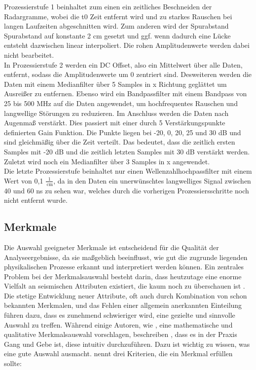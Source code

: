 Prozessierstufe 1 beinhaltet zum einen ein zeitliches Beschneiden der Radargramme, wobei die t0 Zeit entfernt wird und zu starkes Rauschen bei langen Laufzeiten abgeschnitten wird. Zum anderen wird der Spurabstand Spurabstand auf konstante 2 cm gesetzt und ggf. wenn dadurch eine Lücke entsteht dazwischen linear interpoliert. Die rohen Amplitudenwerte werden dabei nicht bearbeitet. \\
In Prozessierstufe 2 werden ein DC Offset, also ein Mittelwert über alle Daten, entfernt, sodass die Amplitudenwerte um 0 zentriert sind. Desweiteren werden die Daten mit einem Medianfilter über 5 Samples in x Richtung geglättet um Ausreißer zu entfernen. Ebenso wird ein Bandpassfilter mit einem Bandpass von 25 bis 500 MHz auf die Daten angewendet, um hochfrequentes Rauschen und langwellige Störungen zu reduzieren. Im Anschluss werden die Daten nach Augenmaß verstärkt. Dies passiert mit einer durch 5 Verstärkungspunkte definierten Gain Funktion. Die Punkte liegen bei -20, 0, 20, 25 und 30 dB und sind gleichmäßig über die Zeit verteilt. Das bedeutet, dass die zeitlich ersten Samples mit -20 dB und die zeitlich letzten Samples mit 30 dB verstärkt werden. Zuletzt wird noch ein Medianfilter über 3 Samples in x angewendet. \\
Die letzte Prozessierstufe beinhaltet nur einen Wellenzahlhochpassfilter mit einem Wert von 0,1 $\frac{1}{\,\mathrm{cm}}$, da in den Daten ein unerwünschtes langwelliges Signal zwischen 40 und 60 ns zu sehen war, welches durch die vorherigen Prozessiersschritte noch nicht entfernt wurde. \\

\clearpage

\subsection{Merkmale}

Die Auswahl geeigneter Merkmale ist entscheidend für die Qualität der Analyseergebnisse, da sie maßgeblich beeinflusst, wie gut die zugrunde liegenden physikalischen Prozesse erkannt und interpretiert werden können. Ein zentrales Problem bei der Merkmalsauswahl besteht darin, dass heutzutage eine enorme Vielfalt an seismischen Attributen existiert, die kaum noch zu überschauen ist \parencites{zhao_seismic_2018}{qi_seismic_2020}{barnes_too_2006}. Die stetige Entwicklung neuer Attribute, oft auch durch Kombination von schon bekannten Merkmalen, und das Fehlen einer allgemein anerkannten Einteilung \parencite{roden_geologic_2015} führen dazu, dass es zunehmend schwieriger wird, eine gezielte und sinnvolle Auswahl zu treffen. Während einige Autoren, wie \textcite{zhao_seismic_2018}, eine mathematische und qualitative Merkmalsauswahl vorschlagen, beschreiben \textcite{chopra_seismic_2007}, dass es in der Praxis Gang und Gebe ist, diese intuitiv durchzuführen. Dazu ist wichtig zu wissen, was eine gute Auswahl ausmacht. \textcite{barnes_too_2006} nennt drei Kriterien, die ein Merkmal erfüllen sollte: \\

